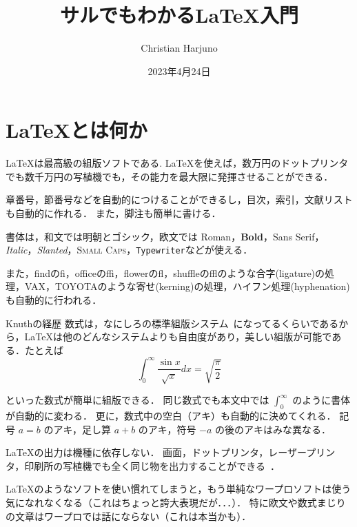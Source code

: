\documentclass[a4j]{jarticle}
\begin{document}
\title{サルでもわかる\LaTeX 入門}
\author{Christian Harjuno}
\date{2023年4月24日}

\maketitle

\section{\LaTeX とは何か}

\LaTeX は最高級の組版ソフトである. \LaTeX を使えば，数万円のドットプリンタでも数千万円の写植機でも，その能力を最大限に発揮させることができる．

\hspace{20mm}章番号，節番号などを自動的につけることができるし，目次，索引，文献リストも自動的に作れる．
また，脚注も簡単に書ける．

\vspace{20mm}



書体は，和文では明朝とゴシック，欧文では Roman，\textbf{Bold}，\textsf{Sans Serif}，\textit{Italic}，\textsl{Slanted}，\textsc{Small Caps}，\texttt{Typewriter}などが使える．



また，findのfi，officeのffi，flowerのfl，shuffleのfflのような合字(ligature)の処理，VAX，TOYOTAのような寄せ(kerning)の処理，ハイフン処理(hyphenation)も自動的に行われる．
\begin{itembox}[l]{Knuthの経歴}
数式は，なにしろの標準組版システム~\cite{Rate06}になってるくらいであるから，\LaTeX は他のどんなシステムよりも自由度があり，美しい組版が可能である．たとえば
  \[ \int_0^\infty \frac{\sin x}{\sqrt{x}}dx
    = \sqrt{\frac{\pi}{2}} \]
\end{itembox}

といった数式が簡単に組版できる．
同じ数式でも本文中では $\int_0^\infty$ のように書体が自動的に変わる．
更に，数式中の空白（アキ）も自動的に決めてくれる．
記号 $a=b$ のアキ，足し算 $a+b$ のアキ，符号 $-a$ の後のアキはみな異なる．

\LaTeX の出力は機種に依存しない．
画面，ドットプリンタ，レーザープリンタ，印刷所の写植機でも全く同じ物を出力することができる~\cite{HM99}．

\LaTeX のようなソフトを使い慣れてしまうと，もう単純なワープロソフトは使う気になれなくなる（これはちょっと誇大表現だが．．．）．
特に欧文や数式まじりの文章はワープロでは話にならない（これは本当かも）．
\end{document}
